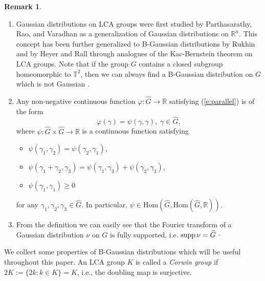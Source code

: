 \documentclass[12pt,reqno]{amsart}
\theoremstyle{definition}
\theoremstyle{definition}
\theoremstyle{definition}
\newtheorem{rem}[thm]{Remark}
\numberwithin{thm}{section}
\numberwithin{equation}{section}
\newcommand{\Real}{\mathbb R}
\newcommand{\tor}{\mathbb{T}}
\newcommand{\wh}[1]{\widehat{#1}}
\newcommand{\vphi}{\varphi}
\newcommand{\bR}{\mathbb{R}}
\begin{document}
\begin{rem}\label{rem-B-Gaussianity}${}$
\begin{enumerate}
    \item Gaussian distributions on LCA groups were first studied by  Parthasarathy, Rao, and Varadhan \cite{Partha1963} as a generalization of Gaussian distributions on $\Real^n$. This concept has been further generalized to B-Gaussian distributions by Rukhin \cite{Rukhin1969} and by Heyer and Rall \cite{HeyerRall1972} through analogues of the Kac-Bernstein theorem on LCA groups.
    Note that if the group $G$ contains a closed subgroup homeomorphic to $\tor^2$, then we can always find a B-Gaussian distribution on $G$ which is not Gaussian \cite[Lemma 9.6]{Feldman}.
        
    \item Any non-negative continuous function $\vphi:\widehat{G}\rightarrow\bR$ satisfying (\ref{e:parallel}) is of the form
        $$\varphi(\gamma) = \psi(\gamma,\gamma),\; \gamma\in \widehat{G},$$
    where $\psi:\widehat{G}\times \widehat{G}\rightarrow\bR$ is a continuous function satisfying
    \begin{itemize}
                \item $\psi(\gamma_1, \gamma_2) = \psi(\gamma_2, \gamma_1)$,

        \item $\psi(\gamma_1 + \gamma_2, \gamma_3) = \psi(\gamma_1, \gamma_3) + \psi(\gamma_2, \gamma_3)$,
                \item $\psi(\gamma_1,\gamma_1)\ge 0$
    \end{itemize}
    for any $\gamma_1, \gamma_2, \gamma_3 \in \widehat{G}$. In particular, $\psi \in \mathrm{Hom}(\widehat{G},\mathrm{Hom}(\widehat{G},\Real))$.
    
    \item From the definition we can easily see that the Fourier transform of a Gaussian distribution $\nu$ on $G$ is fully supported, i.e. ${\rm supp}\, \nu = \wh{G}$·
    

\end{enumerate}

\end{rem}


We collect some properties of B-Gaussian distributions which will be useful throughout this paper. An LCA group $K$ is called a \textit{Corwin group} if $2K := \{2k: k\in K\} = K$, i.e., the doubling map is surjective.
\end{document}
